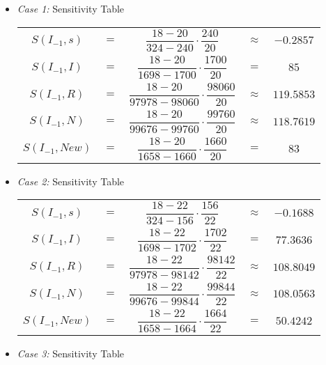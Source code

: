 \documentclass[12pt]{report}
\begin{document}
\begin{itemize}
    \item \emph{Case 1:} Sensitivity Table
    
    \begin{center}
    \begin{tabular}{|ccccc|}
         \hline
         $S(I_{-1},s)$& $=$&$\dfrac{18-20}{324-240}\cdot \dfrac{240}{20}$ &$\approx$&$-0.2857$\\
         $S(I_{-1},I)$& $=$&$\dfrac{18-20}{1698-1700}\cdot \dfrac{1700}{20}$ &$=$&$85$\\
         $S(I_{-1},R)$& $=$&$\dfrac{18-20}{97978-98060}\cdot \dfrac{98060}{20}$ &$\approx$&$119.5853$\\
         $S(I_{-1},N)$& $=$&$\dfrac{18-20}{99676-99760}\cdot \dfrac{99760}{20}$ &$\approx$&$118.7619$\\
         $S(I_{-1},New)$& $=$&$\dfrac{18-20}{1658-1660}\cdot \dfrac{1660}{20}$ &$=$&$83$\\
         \hline
    \end{tabular}
    \end{center}
    
    \item \emph{Case 2:} Sensitivity Table
    
    \begin{center}
    \begin{tabular}{|ccccc|}
         \hline
         $S(I_{-1},s)$& $=$&$\dfrac{18-22}{324-156}\cdot \dfrac{156}{22}$ &$\approx$&$-0.1688$\\
         $S(I_{-1},I)$& $=$&$\dfrac{18-22}{1698-1702}\cdot \dfrac{1702}{22}$ &$=$&$77.3636$\\
         $S(I_{-1},R)$& $=$&$\dfrac{18-22}{97978-98142}\cdot \dfrac{98142}{22}$ &$\approx$&$108.8049$\\
         $S(I_{-1},N)$& $=$&$\dfrac{18-22}{99676-99844}\cdot \dfrac{99844}{22}$ &$\approx$&$108.0563$\\
         $S(I_{-1},New)$& $=$&$\dfrac{18-22}{1658-1664}\cdot \dfrac{1664}{22}$ &$=$&$50.4242$\\
         \hline
    \end{tabular}
    \end{center}
    
    \item \emph{Case 3:} Sensitivity Table
    

\end{itemize}
\end{document}
